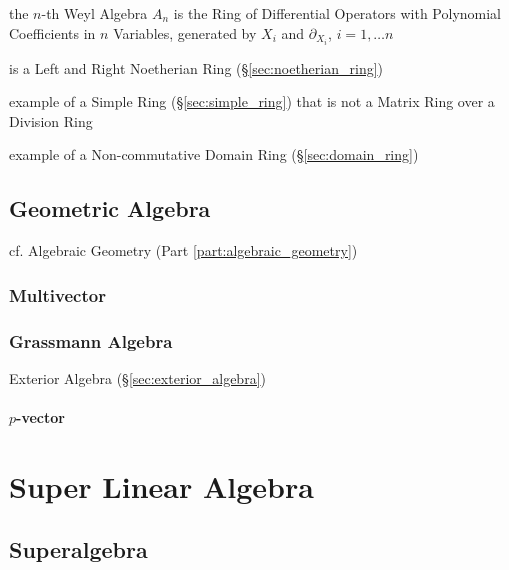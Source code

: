 {{the $n$-th Weyl Algebra $A_n$ is the Ring of Differential Operators with
Polynomial Coefficients in $n$ Variables, generated by $X_i$ and
$\partial_{X_i}$, $i = 1, \ldots n$

is a Left and Right Noetherian Ring (\S\ref{sec:noetherian_ring})

example of a Simple Ring (\S\ref{sec:simple_ring}) that is not a Matrix Ring
over a Division Ring

example of a Non-commutative Domain Ring (\S\ref{sec:domain_ring})



\subsection{Geometric Algebra}\label{sec:geometric_algebra}

cf. Algebraic Geometry (Part \ref{part:algebraic_geometry})



\subsubsection{Multivector}\label{sec:multivector}\hfill

\subsubsection{Grassmann Algebra}\label{sec:grassmann_algebra}

Exterior Algebra (\S\ref{sec:exterior_algebra})

\paragraph{$p$-vector}\label{sec:p_vector}\hfill



\section{Super Linear Algebra}\label{sec:super_linear_algebra}

\subsection{Superalgebra}\label{sec:superalgebra}

}}
